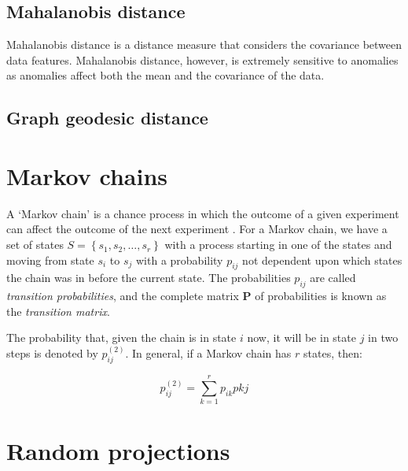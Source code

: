 \subsection{Mahalanobis distance}
\label{sec:mahalanobisDistance}
Mahalanobis distance is a distance measure that considers the covariance between
data features. Mahalanobis distance, however, is extremely sensitive to 
anomalies as anomalies affect both the mean and the covariance of the data.

\subsection{Graph geodesic distance}
\label{sec:graphGeodesicDistance}

\section{Markov chains}
\label{sec:markovChains}
A `Markov chain' is a chance process in which the outcome of a given experiment 
can affect the outcome of the next experiment \cite{Grinstead:1997}. For a 
Markov chain, we have a set of states $S = \left\{ s_{1}, s_{2}, \ldots, s_{r} 
\right\}$ with a process starting in one of the states and moving from state 
$s_{i}$ to $s_{j}$ with a probability $p_{ij}$ not dependent upon which states 
the chain was in before the current state. The probabilities $p_{ij}$ are called
\emph{transition probabilities}, and the complete matrix $\mathbf{P}$ of 
probabilities is known as the \emph{transition matrix}.

The probability that, given the chain is in state $i$ now, it will be in state 
$j$ in two steps is denoted by $p_{ij}^{(2)}$. In general, if a Markov chain has 
$r$ states, then:

\begin{equation}
p_{ij}^{(2)} = \sum_{k=1}^{r} p_{ik}p{kj}
\end{equation}

\section{Random projections}
\label{sec:randomProjections}

